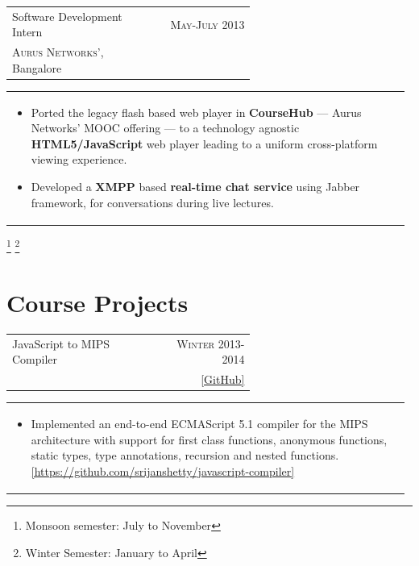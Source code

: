 \documentclass[a4paper]{article} %
\newcommand{\verticalspacing}{-0.25cm}
\newcommand{\bulletspace}{0.7cm}
\newcommand{\cproject}[5]{
    \begin{tabular}{p{0.60\linewidth}r}
        \textcolor{NavyBlue}{\small #2} & \multicolumn{1}{m{7.3cm}}{\raggedleft \small {\textsc{#1}}}\\
        \small {#3} & \small {#4}
    \end{tabular}
    \begin{tabular}{p{0.98\linewidth}}
    \vspace{-0.3cm}
        \small{#5}
    \end{tabular}
    \vspace{\verticalspacing{}}
}
\begin{document}
\cproject
    {May-July 2013}
    {Software Development Intern}
    {\textsc{Aurus Networks'}, Bangalore}
    {}
    {
        \begin{itemize}[leftmargin=\bulletspace{}]
            \item Ported the legacy flash based web player in \textbf{CourseHub} --- Aurus Networks'
                MOOC offering --- to a technology agnostic \textbf{HTML5/JavaScript} web player leading
                to a uniform cross-platform viewing experience.
            \item Developed a \textbf{XMPP} based \textbf{real-time chat service} using Jabber framework,
                for conversations during live lectures.
        \end{itemize}
    }

\vspace{-0.65cm}
\let\thefootnote\relax\footnote{Monsoon semester: July to November}
\let\thefootnote\relax\footnote{Winter Semester: January to April}
\section{Course Projects}

\cproject
    {Winter 2013-2014}
    {JavaScript to MIPS Compiler}
    {\textsc{\raggedright Compilers}, Professor Subhajit Roy}
    { \href{https://github.com/srijanshetty/javascript-compiler} {[GitHub]} }
    {
        \begin{itemize}[leftmargin=\bulletspace{}]
            \item Implemented an end-to-end ECMAScript 5.1 compiler for the MIPS architecture with support for first class
                functions, anonymous functions, static types, type annotations, recursion and nested functions.
                \href{https://github.com/srijanshetty/javascript-compiler} {[https://github.com/srijanshetty/javascript-compiler]}
        \end{itemize}
    }
\end{document}
